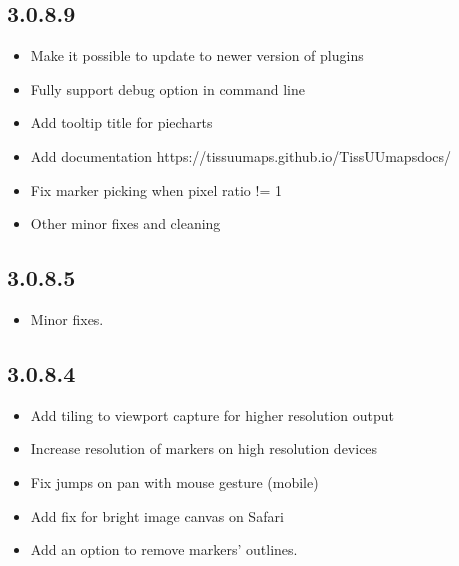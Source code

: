 \documentclass[letterpaper,10pt,english,openany,oneside]{sphinxmanual}
\begin{document}
\subsection{3.0.8.9}
\label{\detokenize{docs/intro/versions:id3}}\begin{itemize}
\item {} 
\sphinxAtStartPar
Make it possible to update to newer version of plugins

\item {} 
\sphinxAtStartPar
Fully support \textendash{}debug option in command line

\item {} 
\sphinxAtStartPar
Add tooltip title for piecharts

\item {} 
\sphinxAtStartPar
Add documentation https://tissuumaps.github.io/TissUUmaps\sphinxhyphen{}docs/

\item {} 
\sphinxAtStartPar
Fix marker picking when pixel ratio != 1

\item {} 
\sphinxAtStartPar
Other minor fixes and cleaning

\end{itemize}


\subsection{3.0.8.5}
\label{\detokenize{docs/intro/versions:id4}}\begin{itemize}
\item {} 
\sphinxAtStartPar
Minor fixes.

\end{itemize}


\subsection{3.0.8.4}
\label{\detokenize{docs/intro/versions:id5}}\begin{itemize}
\item {} 
\sphinxAtStartPar
Add tiling to viewport capture for higher resolution output

\item {} 
\sphinxAtStartPar
Increase resolution of markers on high resolution devices

\item {} 
\sphinxAtStartPar
Fix jumps on pan with mouse gesture (mobile)

\item {} 
\sphinxAtStartPar
Add fix for bright image canvas on Safari

\item {} 
\sphinxAtStartPar
Add an option to remove markers’ outlines.

\end{itemize}
\end{document}
